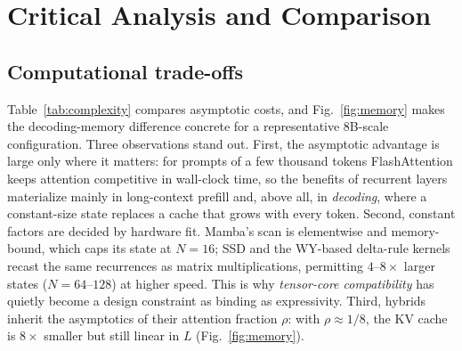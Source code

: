 \documentclass[a4paper]{article}
\theoremstyle{plain}
\theoremstyle{remark}
\begin{document}
\section{Critical Analysis and Comparison}
\label{sec:analysis}

\subsection{Computational trade-offs}
\label{sec:compute}
Table~\ref{tab:complexity} compares asymptotic costs, and Fig.~\ref{fig:memory} makes the decoding-memory difference concrete for a representative 8B-scale configuration. Three observations stand out. First, the asymptotic advantage is large only where it matters: for prompts of a few thousand tokens FlashAttention \citep{dao2022flashattention} keeps attention competitive in wall-clock time, so the benefits of recurrent layers materialize mainly in long-context prefill and, above all, in \emph{decoding}, where a constant-size state replaces a cache that grows with every token. Second, constant factors are decided by hardware fit. Mamba's scan is elementwise and memory-bound, which caps its state at $N{=}16$; SSD and the WY-based delta-rule kernels recast the same recurrences as matrix multiplications, permitting $4$--$8\times$ larger states ($N{=}64$--$128$) at higher speed. This is why \emph{tensor-core compatibility} has quietly become a design constraint as binding as expressivity. Third, hybrids inherit the asymptotics of their attention fraction $\rho$: with $\rho\approx1/8$, the KV cache is $8\times$ smaller but still linear in $L$ (Fig.~\ref{fig:memory}).
\end{document}
